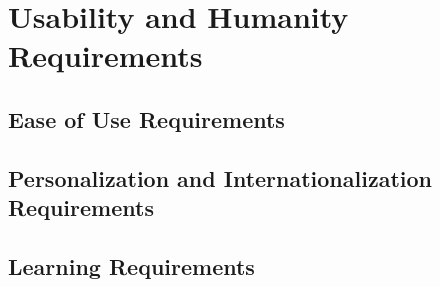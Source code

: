 \chapter{Usability and Humanity Requirements}

\section{Ease of Use Requirements}

\section{Personalization and Internationalization Requirements}

\section{Learning Requirements}

